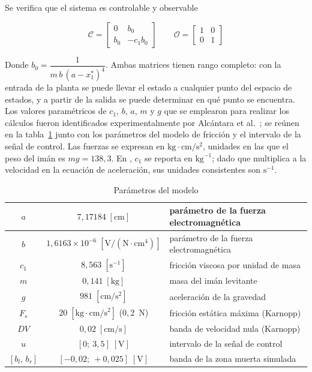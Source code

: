 Se verifica que el sistema es controlable y observable

\[
\mathcal{C}
=
\begin{bmatrix}
0 & b_0\\[6pt]
b_0 & -c_1 b_0
\end{bmatrix}
\qquad
\mathcal{O}
=
\begin{bmatrix}
1 & 0\\[6pt]
0 & 1
\end{bmatrix}
\]

Donde $b_0 = \dfrac{1}{m\,b\,(a-x_1^{\ast})^4}$. Ambas matrices tienen rango completo: con la entrada de la planta se puede llevar el estado a cualquier punto del espacio de estados, y a partir de la salida se puede determinar en qué punto se encuentra.
Los valores paramétricos de $c_1$, $b$, $a$, $m$ y $g$ que se emplearon para realizar los cálculos fueron identificados experimentalmente por Alcántara et al.\ \cite{diana_tesis}; se reúnen en la tabla~\ref{tab:parametros} junto con los parámetros del modelo de fricción y el intervalo de la señal de control. Las fuerzas se expresan en $\text{kg}\cdot\text{cm}/\text{s}^2$, unidades en las que el peso del imán es $mg = 138{,}3$. En \cite{diana_tesis}, $c_1$ se reporta en $\text{kg}^{-1}$; dado que multiplica a la velocidad en la ecuación de aceleración, sus unidades consistentes son $\text{s}^{-1}$.

\begin{table}[h]
\centering
\caption{Parámetros del modelo}
\label{tab:parametros}
\begin{tabular}{|c|c|l|}
\hline
$a$ & $7{,}17184\;[\text{cm}]$ & parámetro de la fuerza electromagnética \\ \hline
$b$ & $1{,}6163 \times 10^{-6}\;[\text{V}/(\text{N}\cdot\text{cm}^4)]$ & parámetro de la fuerza electromagnética \\ \hline
$c_1$ & $8{,}563\;[\text{s}^{-1}]$ & fricción viscosa por unidad de masa \\ \hline
$m$ & $0{,}141\;[\text{kg}]$ & masa del imán levitante \\ \hline
$g$ & $981\;[\text{cm}/\text{s}^2]$ & aceleración de la gravedad \\ \hline
$F_s$ & $20\;[\text{kg}\cdot\text{cm}/\text{s}^2]$ ($0{,}2$~N) & fricción estática máxima (Karnopp) \\ \hline
$DV$ & $0{,}02\;[\text{cm}/\text{s}]$ & banda de velocidad nula (Karnopp) \\ \hline
$u$ & $[0;\ 3{,}5]\;[\text{V}]$ & intervalo de la señal de control \\ \hline
$[b_l,\,b_r]$ & $[-0{,}02;\ +0{,}025]\;[\text{V}]$ & banda de la zona muerta simulada \\ \hline
\end{tabular}
\end{table}


